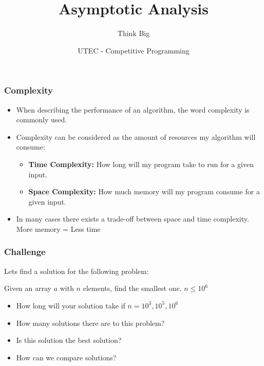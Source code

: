 \documentclass{beamer}
\begin{document}
\newcommand{\tabitem}{~~\llap{\textbullet}~~}




\title{Asymptotic Analysis}
\subtitle{Think Big}
\author{UTEC - Competitive Programming}
\date{}

\maketitle

\begin{frame}
	\frametitle{Complexity}

	\begin{itemize}
		\item When describing the performance of an algorithm, the word complexity is commonly used.
		\item Complexity can be considered as the amount of resources my algorithm will consume:
			\begin{itemize}
				\item \textbf{Time Complexity:} How long will my program take to run for a given input.
				\item \textbf{Space Complexity:} How much memory will my program consume for a given input.
			\end{itemize}
		\item In many cases there exists a trade-off between space and time complexity. More memory = Less time
	\end{itemize}
\end{frame}

\begin{frame}
	\frametitle{Challenge}

	Lets find a solution for the following problem:
	\begin{center}
		Given an array $a$ with $n$ elements, find the smallest one. $n \leq 10^6$
	\end{center}

	\begin{itemize}
		\item<2-> How long will your solution take if $n = 10^3, 10^5, 10^6$
		\item<3-> How many solutions there are to this problem?
		\item<4-> Is this solution the best solution?
		\item<5-> How can we compare solutions?
	\end{itemize}
\end{frame}
\end{document}

